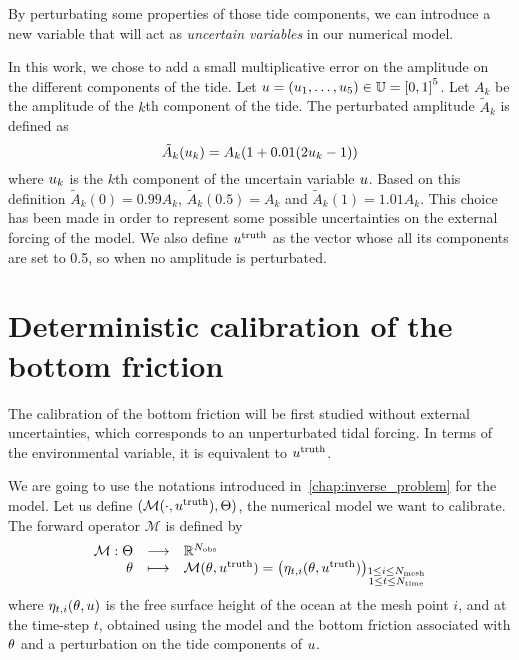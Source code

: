 \documentclass[../../Main_ManuscritThese.tex]{subfiles}
\begin{document}
By perturbating some properties of those tide components, we can
introduce a new variable that will act as \emph{uncertain variables} in
our numerical model.

In this work, we chose to add a small multiplicative error on the
amplitude on the different components of the tide.  Let
$\uu = (\uu_1,\dots,\uu_5)\in \Uspace = \interval{0}{1}^5$. Let $A_k$
be the amplitude of the $k$th component of the tide. The perturbated
amplitude $\tilde{A}_k$ is defined as
\begin{equation}
  \label{eq:tide_error}
  \tilde{A}_k(u_k) = A_k (1 + 0.01(2u_k - 1))
\end{equation}
where $u_k$ is the $k$th component of the uncertain variable $u$.
Based on this definition $\tilde{A}_k(0) = 0.99A_k$,
$\tilde{A}_k(0.5) = A_k$ and $\tilde{A}_k(1) = 1.01A_k$. This choice
has been made in order to represent some possible uncertainties on the
external forcing of the model. We also define $u^{\mathrm{truth}}$
as the vector whose all its components are set to \num{0.5}, so when
no amplitude is perturbated.

\section{Deterministic calibration of the bottom friction}
\label{sec:deterministic_calibration_bott}
The calibration of the bottom friction will be first studied without
external uncertainties, which corresponds to an unperturbated tidal
forcing. In terms of the environmental variable, it is equivalent to
$u^{\mathrm{truth}}$.

We are going to use the notations introduced
in~\cref{chap:inverse_problem} for the model. Let us define
$(\mathcal{M}(\cdot,u^{\mathrm{truth}}),\Theta)$, the numerical
model we want to calibrate. The forward operator $\mathcal{M}$ is
defined by
\begin{equation}
  \begin{array}{rcl}
    \mathcal{M}: \Theta  &\longrightarrow& \mathbb{R}^{N_{\mathrm{obs}}} \\
    \theta & \longmapsto & \mathcal{M}(\theta, u^{\mathrm{truth}}) = \left(\eta_{t,i}(\theta, u^{\mathrm{truth}})\right)_{\substack{1 \leq i \leq N_{\mathrm{mesh}} \\ 1 \leq t \leq N_{\mathrm{time}}}} \\ 
  \end{array}
\end{equation}
where $\eta_{t,i}(\theta,u)$ is the free surface height of the ocean at
the mesh point $i$, and at the time-step $t$, obtained using the model
and the bottom friction associated with $\theta$ and a perturbation on
the tide components of $u$.
\end{document}
